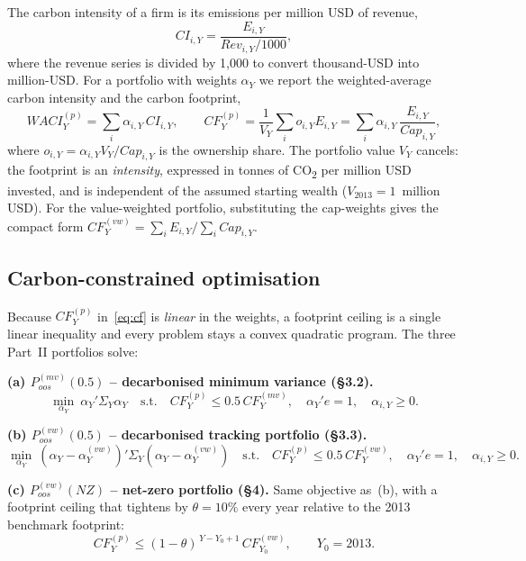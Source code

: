\documentclass[11pt,a4paper]{article}
\newcommand{\pmvh}{$P^{(mv)}_{oos}(0.5)$}
\newcommand{\pvwh}{$P^{(vw)}_{oos}(0.5)$}
\newcommand{\pnz}{$P^{(vw)}_{oos}(NZ)$}
\newcommand{\co}{CO\textsubscript{2}}
\begin{document}
The carbon intensity of a firm is its emissions per million USD of revenue,
\begin{equation}
CI_{i,Y}=\frac{E_{i,Y}}{Rev_{i,Y}/1000},
\end{equation}
where the revenue series is divided by 1{,}000 to convert thousand-USD into
million-USD. For a portfolio with weights $\alpha_Y$ we report the
weighted-average carbon intensity and the carbon footprint,
\begin{equation}
WACI^{(p)}_Y=\sum_{i}\alpha_{i,Y}\,CI_{i,Y},
\qquad
CF^{(p)}_Y=\frac{1}{V_Y}\sum_i o_{i,Y}E_{i,Y}
          =\sum_i \alpha_{i,Y}\,\frac{E_{i,Y}}{Cap_{i,Y}},
\label{eq:cf}
\end{equation}
where $o_{i,Y}=\alpha_{i,Y}V_Y/Cap_{i,Y}$ is the ownership share. The portfolio
value $V_Y$ cancels: the footprint is an \emph{intensity}, expressed in tonnes
of \co{} per million USD invested, and is independent of the assumed
starting wealth ($V_{2013}=1$~million USD). For the value-weighted portfolio,
substituting the cap-weights gives the compact form
$CF^{(vw)}_Y=\sum_i E_{i,Y}/\sum_i Cap_{i,Y}$.

\subsection{Carbon-constrained optimisation}

Because $CF^{(p)}_Y$ in~\eqref{eq:cf} is \emph{linear} in the weights, a
footprint ceiling is a single linear inequality and every problem stays a
convex quadratic program. The three Part~II portfolios solve:

\smallskip
\noindent\textbf{(a) \pmvh{} -- decarbonised minimum variance (\S3.2).}
\begin{equation}
\min_{\alpha_Y}\ \alpha_Y'\Sigma_Y\alpha_Y
\quad\text{s.t.}\quad
CF^{(p)}_Y\le 0.5\,CF^{(mv)}_Y,\quad
\alpha_Y'e=1,\quad \alpha_{i,Y}\ge 0 .
\end{equation}

\noindent\textbf{(b) \pvwh{} -- decarbonised tracking portfolio (\S3.3).}
\begin{equation}
\min_{\alpha_Y}\ (\alpha_Y-\alpha^{(vw)}_Y)'\Sigma_Y(\alpha_Y-\alpha^{(vw)}_Y)
\quad\text{s.t.}\quad
CF^{(p)}_Y\le 0.5\,CF^{(vw)}_Y,\quad
\alpha_Y'e=1,\quad \alpha_{i,Y}\ge 0 .
\end{equation}

\noindent\textbf{(c) \pnz{} -- net-zero portfolio (\S4).} Same objective as~(b),
with a footprint ceiling that tightens by $\theta=10\%$ every year relative to
the 2013 benchmark footprint:
\begin{equation}
CF^{(p)}_Y\le(1-\theta)^{\,Y-Y_0+1}\,CF^{(vw)}_{Y_0},
\qquad Y_0=2013 .
\end{equation}
\end{document}
